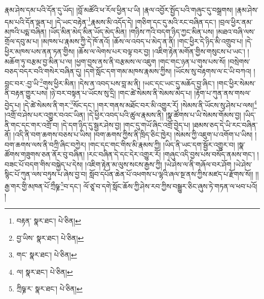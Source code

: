 རྣམ་ཤེས་དམ་པའི་དོན་དུ་ཡོད། །བློ་མཚོའི་ཕ་རོལ་ཕྱིན་པ་ཡི། །རྣལ་འབྱོར་སྤྱོད་པའི་གཞུང་དུ་བསྒྲགས། །རྣམ་ཤེས་དམ་པའི་དོན་ལྡན་པ། །དེ་ཡང་བརྟེན་\footnote{བརྟན་  སྣར་ཐང་།  པེ་ཅིན། }རྣམས་མི་འདོད་དེ། །གཅིག་དང་དུ་མའི་རང་བཞིན་དང་། །བྲལ་ཕྱིར་ནམ་མཁའི་པདྨ་བཞིན། །ཡོད་མིན་མེད་མིན་ཡོད་མེད་མིན། །གཉིས་ཀའི་བདག་ཉིད་ཀྱང་མིན་པས། །མཐའ་བཞི་ལས་གྲོལ་དབུ་མ་པ། །མཁས་པ་རྣམས་ཀྱི་དེ་ཁོ་ནའོ། །ཆོས་ལ་འབད་པ་མེད་ན་ནི། །གང་ཕྱིར་དེ་ཉིད་མི་འགྲུབ་པ། །དེ་ཕྱིར་མཁས་པས་ནན་ཏན་གྱིས། །ཆོས་ལ་ལེགས་པར་བལྟ་བར་བྱ། །འཇིག་རྟེན་མགོན་གྱིས་གསུངས་པ་ཡང་། །མཆོག་ཏུ་བརྩམ་བྱ་མིན་པ་ལ། །ཕྱག་བྱས་ནས་ནི་བརྩམས་ལ་འཇུག །གང་གང་ཉན་པ་གུས་པས་སོ། །བསྲེགས་བཅད་བདར་བའི་གསེར་བཞིན་དུ། །དགེ་སློང་དག་གམ་མཁས་རྣམས་ཀྱིས། །ཡོངས་སུ་བརྟགས་ལ་ང་ཡི་བཀའ། །བླང་བར་:བྱ་ཡི་\footnote{བྱ་ཡིས་  སྣར་ཐང་།  པེ་ཅིན། }གུས་ཕྱིར་མིན། །དེས་ན་འབད་པས་བླ་མ་ནི། །ཡང་དང་ཡང་དུ་མཆོད་བྱ་ཞིང་། །གང་ཕྱིར་སེམས་ནི་བརྟན་གྱུར་པས། །ཉེ་བར་བསྟན་པ་ཡོངས་སུ་དྲི། །གང་ཚེ་སེམས་ནི་སེམས་མེད་པ། །རྟོག་པ་ཀུན་ནས་གསལ་བྱེད་པ། །དེ་ཚེ་སེམས་ནི་གར་\footnote{གང་  སྣར་ཐང་།  པེ་ཅིན། }སོང་དང་། །གར་གནས་མཐོང་བར་མི་འགྱུར་རོ། །སེམས་ནི་ཡོངས་སུ་ཤེས་པ་ལས།\footnote{ལ།  སྣར་ཐང་།  པེ་ཅིན། } །འགྲོ་བ་ཤེས་པར་འགྱུར་བའང་ཡིན། །དེ་ཕྱིར་འབད་པའི་ཚུལ་རྣམས་ནི། །སྣ་ཚོགས་པ་ཡི་སེམས་གོམས་བྱ། །ཡིད་ནི་གང་དང་གར་འགྲོ་བ། །དེ་དག་ཉིད་དུ་སྦྱར་ཤེས་བྱ། །གང་དུ་གཡོ་ཞིང་འགྲོ་བྱེད་པ། །ཐམས་ཅད་དེ་ཡི་རང་བཞིན་ནོ། །འདི་ནི་བག་ཆགས་བཅས་པ་ཡིས། །བག་ཆགས་ཀྱིས་ནི་ཁྲིད་ཅིང་ཁྱེར། །སེམས་ཀྱི་འཇུག་པ་འགོག་པ་ཡིས། །བག་ཆགས་ལས་ནི་བཀྲི་ཞིང་བཀྱེར། །གང་དང་གང་གིས་མི་རྣམས་ཀྱི། །ཡིད་ནི་ཡང་དག་སྦྱོར་འགྱུར་བ། །སྣ་ཚོགས་གཟུགས་ཅན་ནོར་བུ་བཞིན། །རང་བཞིན་དེ་དང་དེར་འགྱུར་རོ། །གཞུང་འདི་བྱས་པས་བསོད་ནམས་གང་། །བཟང་པོ་བདག་གིས་བསྐྱེད་པ་དེས། །འཇིག་རྟེན་མ་ལུས་སངས་རྒྱས་ཀྱི། །ཡེ་ཤེས་ལ་ནི་གཞོལ་བར་ཤོག །ཡེ་ཤེས་སྙིང་པོ་ཀུན་ལས་བཏུས་པ་ཞེས་བྱ་བ། སློབ་དཔོན་ཆེན་པོ་འཕགས་པ་ལྷའི་ཞལ་སྔ་ནས་ཀྱིས་མཛད་པ་རྫོགས་སོ།། །།རྒྱ་གར་གྱི་མཁན་པོ་ཀྲྀཥྞ་\footnote{ཀྲིཥྞ་ར་  སྣར་ཐང་།  པེ་ཅིན། }བ་དང་། ལོ་ཙཱ་བ་དགེ་སློང་ཆོས་ཀྱི་ཤེས་རབ་ཀྱིས་བསྒྱུར་ཅིང་ཞུས་ཏེ་གཏན་ལ་ཕབ་པའོ། །
 